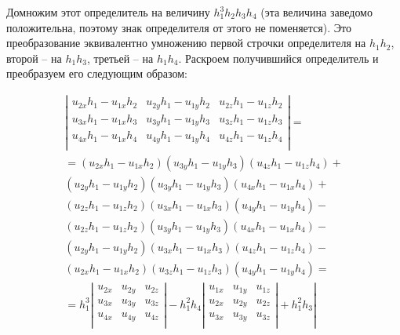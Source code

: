 \documentclass[a4paper, 12pt, titlepage]{article}
\theoremstyle{definition}
\theoremstyle{plain}
\theoremstyle{plain}
\begin{document}
Домножим этот определитель на величину $h_{1}^{3} h_{2} h_{3} h_{4}$ (эта
величина заведомо положительна, поэтому знак определителя от этого не
поменяется). Это преобразование эквивалентно умножению первой строчки
определителя на $h_{1} h_{2}$, второй -- на $h_{1} h_{3}$, третьей -- на
$h_{1} h_{4}$. Раскроем получившийся определитель и преобразуем его следующим
образом:

\begin{multline}
\left|\begin{array}{ccc}
  u_{2x} h_{1} - u_{1x} h_{2} &
  u_{2y} h_{1} - u_{1y} h_{2} &
  u_{2z} h_{1} - u_{1z} h_{2} \\
  u_{3x} h_{1} - u_{1x} h_{3} &
  u_{3y} h_{1} - u_{1y} h_{3} &
  u_{3z} h_{1} - u_{1z} h_{3} \\
  u_{4x} h_{1} - u_{1x} h_{4} &
  u_{4y} h_{1} - u_{1y} h_{4} &
  u_{4z} h_{1} - u_{1z} h_{4} \\
\end{array}\right| = \\ =
(u_{2x} h_{1} - u_{1x} h_{2})
(u_{3y} h_{1} - u_{1y} h_{3})
(u_{4z} h_{1} - u_{1z} h_{4}) + \\
(u_{2y} h_{1} - u_{1y} h_{2})
(u_{3y} h_{1} - u_{1y} h_{3})
(u_{4x} h_{1} - u_{1x} h_{4}) + \\
(u_{2z} h_{1} - u_{1z} h_{2})
(u_{3x} h_{1} - u_{1x} h_{3})
(u_{4y} h_{1} - u_{1y} h_{4}) - \\
(u_{2z} h_{1} - u_{1z} h_{2})
(u_{3y} h_{1} - u_{1y} h_{3})
(u_{4x} h_{1} - u_{1x} h_{4}) - \\
(u_{2y} h_{1} - u_{1y} h_{2})
(u_{3x} h_{1} - u_{1x} h_{3})
(u_{4z} h_{1} - u_{1z} h_{4}) - \\
(u_{2x} h_{1} - u_{1x} h_{2})
(u_{3z} h_{1} - u_{1z} h_{3})
(u_{4y} h_{1} - u_{1y} h_{4}) = \\ =
h_{1}^{3}
\left|
  \begin{array}{ccc}
  u_{2x} & u_{2y} & u_{2z} \\
  u_{3x} & u_{3y} & u_{3z} \\
  u_{4x} & u_{4y} & u_{4z} \\
  \end{array}
\right| -
  h_{1}^{2} h_{4}
\left|
  \begin{array}{ccc}
  u_{1x} & u_{1y} & u_{1z} \\
  u_{2x} & u_{2y} & u_{2z} \\
  u_{3x} & u_{3y} & u_{3z} \\
  \end{array}
\right| +
  h_{1}^{2} h_{3}
\left|

\end{multline}
\end{document}
